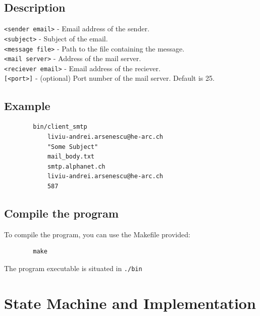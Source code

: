\documentclass[12pt,a4paper]{article}
\begin{document}
    \subsection{Description}
    \verb|<sender email>| - Email address of the sender. \\
    \verb|<subject>| - Subject of the email. \\
    \verb|<message file>| - Path to the file containing the message. \\
    \verb|<mail server>| - Address of the mail server. \\
    \verb|<reciever email>| - Email address of the reciever. \\
    \verb|[<port>]| - (optional) Port number of the mail server. Default is 25.
    \subsection{Example}
    \begin{verbatim}
        bin/client_smtp
            liviu-andrei.arsenescu@he-arc.ch
            "Some Subject"
            mail_body.txt
            smtp.alphanet.ch
            liviu-andrei.arsenescu@he-arc.ch
            587
    \end{verbatim}
    \subsection{Compile the program}
    To compile the program, you can use the Makefile provided:
    \begin{verbatim}
        make
    \end{verbatim}
    The program executable is situated in \verb|./bin|
    \section{State Machine and Implementation}
\end{document}
